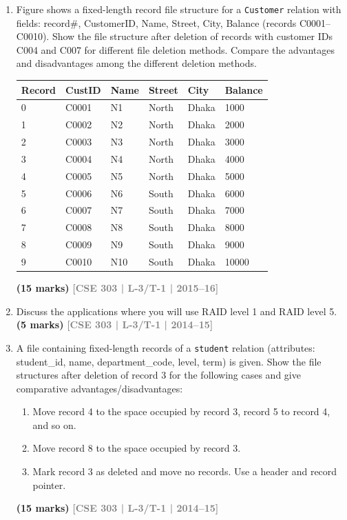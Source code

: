 \documentclass[12pt]{article}
\newcommand{\yr}[1]{\hfill\textcolor{gray}{\small\textbf{[#1]}}}
\newcommand{\mk}[1]{\textcolor{orange!70!black}{\small\textbf{(#1 marks)}}}
\begin{document}
\begin{enumerate}
\item Figure shows a fixed-length record file structure for a \texttt{Customer} relation with fields: record\#, CustomerID, Name, Street, City, Balance (records C0001--C0010). Show the file structure after deletion of records with customer IDs C004 and C007 for different file deletion methods. Compare the advantages and disadvantages among the different deletion methods.
\medskip
\begin{center}
\small
\begin{tabular}{llllll}
\toprule
\textbf{Record} & \textbf{CustID} & \textbf{Name} & \textbf{Street} & \textbf{City} & \textbf{Balance}\\
\midrule
0 & C0001 & N1 & North & Dhaka & 1000\\
1 & C0002 & N2 & North & Dhaka & 2000\\
2 & C0003 & N3 & North & Dhaka & 3000\\
3 & C0004 & N4 & North & Dhaka & 4000\\
4 & C0005 & N5 & North & Dhaka & 5000\\
5 & C0006 & N6 & South & Dhaka & 6000\\
6 & C0007 & N7 & South & Dhaka & 7000\\
7 & C0008 & N8 & South & Dhaka & 8000\\
8 & C0009 & N9 & South & Dhaka & 9000\\
9 & C0010 & N10 & South & Dhaka & 10000\\
\bottomrule
\end{tabular}
\end{center}
\mk{15} \yr{CSE 303 | L-3/T-1 | 2015--16}


\item Discuss the applications where you will use RAID level 1 and RAID level 5.
\mk{5} \yr{CSE 303 | L-3/T-1 | 2014--15}


\item A file containing fixed-length records of a \texttt{student} relation (attributes: student\_id, name, department\_code, level, term) is given. Show the file structures after deletion of record 3 for the following cases and give comparative advantages/disadvantages:
\begin{enumerate}
  \item Move record 4 to the space occupied by record 3, record 5 to record 4, and so on.
  \item Move record 8 to the space occupied by record 3.
  \item Mark record 3 as deleted and move no records. Use a header and record pointer.
\end{enumerate}
\mk{15} \yr{CSE 303 | L-3/T-1 | 2014--15}



\end{enumerate}
\end{document}
